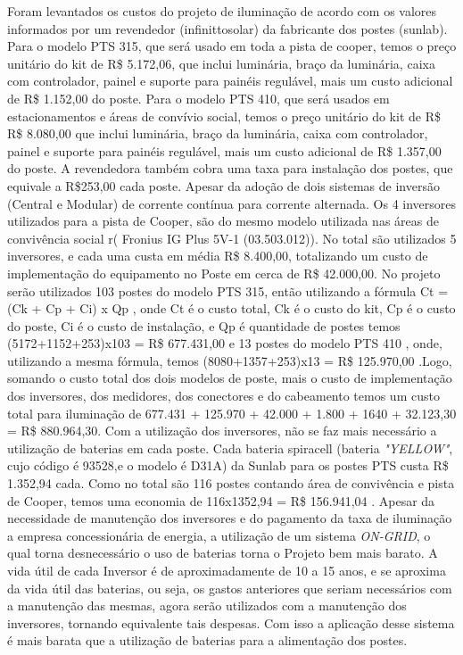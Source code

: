 	Foram levantados os custos do projeto de ilumina\c{c}\~ao de acordo com os valores informados por um revendedor (infinittosolar) da fabricante dos postes (sunlab).
	Para o modelo PTS 315, que ser\'a usado em toda a pista de cooper, temos  o pre\c{c}o unit\'ario do  kit de R\$ 5.172,06, que inclui lumin\'aria, bra\c{c}o da lumin\'aria, caixa com controlador, painel e suporte para pain\'eis regul\'avel, mais um custo adicional de R\$ 1.152,00 do poste. Para o modelo PTS 410, que ser\'a usados em estacionamentos e \'areas de conv\'ivio social, temos o pre\c{c}o unit\'ario do kit de R\$ R\$ 8.080,00 que inclui lumin\'aria, bra\c{c}o da lumin\'aria, caixa com controlador, painel e suporte para pain\'eis regul\'avel, mais um custo adicional de R\$ 1.357,00 do poste. A revendedora tamb\'em cobra uma taxa para instala\c{c}\~ao dos postes, que equivale a R\$253,00 cada poste.
	Apesar da ado\c{c}\~ao de dois sistemas de invers\~ao (Central e Modular) de corrente cont\'inua para corrente alternada. Os 4 inversores utilizados para a pista de Cooper, s\~ao do mesmo modelo utilizada nas \'areas de conviv\^encia social r( Fronius IG Plus 5V-1 (03.503.012)). No total s\~ao utilizados 5 inversores, e cada uma custa em m\'edia R\$ 8.400,00, totalizando um custo de implementa\c{c}\~ao do equipamento no Poste em cerca de R\$ 42.000,00.
	No projeto ser\~ao utilizados 103 postes do modelo PTS 315, ent\~ao utilizando a f\'ormula Ct = (Ck + Cp + Ci) x Qp , onde Ct \'e o custo total, Ck \'e o custo do kit, Cp \'e o custo do poste, Ci \'e o custo de instala\c{c}\~ao, e Qp \'e quantidade de postes temos (5172+1152+253)x103 = R\$ 677.431,00 e 13 postes do modelo PTS 410 , onde, utilizando a mesma f\'ormula, temos (8080+1357+253)x13 = R\$ 125.970,00 .Logo, somando o custo total dos dois modelos de poste, mais o custo de implementa\c{c}\~ao dos inversores, dos medidores, dos conectores e do cabeamento temos um custo total para ilumina\c{c}\~ao de 677.431 + 125.970 + 42.000 + 1.800 + 1640 + 32.123,30 = R\$ 880.964,30.
	Com a utiliza\c{c}\~ao dos inversores, n\~ao se faz mais necess\'ario a utiliza\c{c}\~ao de baterias em cada poste. Cada bateria spiracell (bateria \textit{"YELLOW"}, cujo c\'odigo \'e 93528,e o modelo \'e  D31A) da Sunlab para os postes PTS custa R\$ 1.352,94 cada. Como no total s\~ao 116 postes contando \'area de conviv\^encia e pista de Cooper, temos uma economia de 116x1352,94 = R\$ 156.941,04 .	
	Apesar da necessidade de manuten\c{c}\~ao dos inversores e do pagamento da taxa de ilumina\c{c}\~ao a empresa concession\'aria de energia, a utiliza\c{c}\~ao de um sistema \textit{ON-GRID}, o qual torna desnecess\'ario o uso de baterias torna o Projeto bem mais barato. A vida \'util de cada Inversor \'e de aproximadamente de 10 a 15 anos, e se aproxima da vida \'util das baterias, ou seja, os gastos anteriores que seriam necess\'arios com a manuten\c{c}\~ao das mesmas, agora ser\~ao utilizados com a manuten\c{c}\~ao dos inversores, tornando equivalente tais despesas. Com isso a aplica\c{c}\~ao desse sistema \'e mais barata que a utiliza\c{c}\~ao de baterias para a alimenta\c{c}\~ao dos postes.
	
